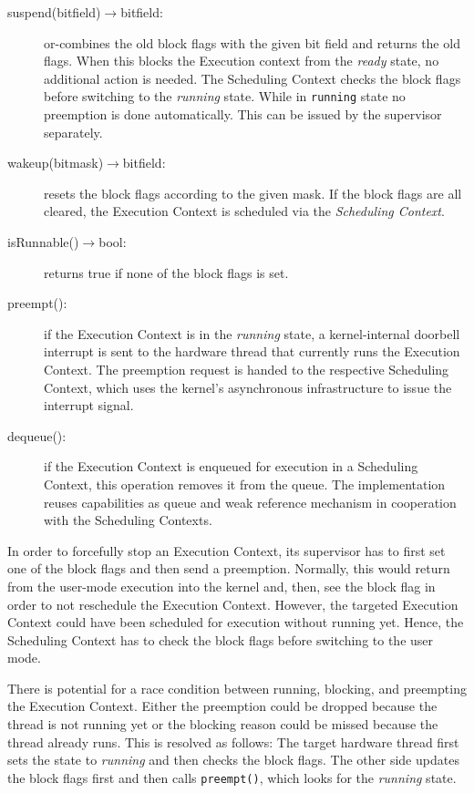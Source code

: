 \begin{description}
\item[suspend(bitfield)$\rightarrow$bitfield:] or-combines the old block flags with the given bit field and returns the old flags. When this blocks the Execution context from the \emph{ready} state, no additional action is needed. The Scheduling Context checks the block flags before switching to the \emph{running} state. While in \texttt{running} state no preemption is done automatically. This can be issued by the supervisor separately.

\item[wakeup(bitmask)$\rightarrow$bitfield:] resets the block flags according to the given mask. If the block flags are all cleared, the Execution Context is scheduled via the \emph{Scheduling Context}.

\item[isRunnable()$\rightarrow$bool:] returns true if none of the block flags is set.

\item[preempt():] if the Execution Context is in the \emph{running} state, a kernel-internal doorbell interrupt is sent to the hardware thread that currently runs the Execution Context. The preemption request is handed to the respective Scheduling Context, which uses the kernel's asynchronous infrastructure to issue the interrupt signal.

\item[dequeue():] if the Execution Context is enqueued for execution in a Scheduling Context, this operation removes it from the queue. The implementation reuses capabilities as queue and weak reference mechanism in cooperation with the Scheduling Contexts. 
\end{description}

In order to forcefully stop an Execution Context, its supervisor has to first set one of the block flags and then send a preemption. Normally, this would return from the user-mode execution into the kernel and, then, see the block flag in order to not reschedule the Execution Context. However, the targeted Execution Context could have been scheduled for execution without running yet. Hence, the Scheduling Context has to check the block flags before switching to the user mode.

There is potential for a race condition between running, blocking, and preempting the Execution Context. Either the preemption could be dropped because the thread is not running yet or the blocking reason could be missed because the thread already runs. This is resolved as follows: The target hardware thread first sets the state to \emph{running} and then checks the block flags. The other side updates the block flags first and then calls \texttt{preempt()}, which looks for the \emph{running} state.

